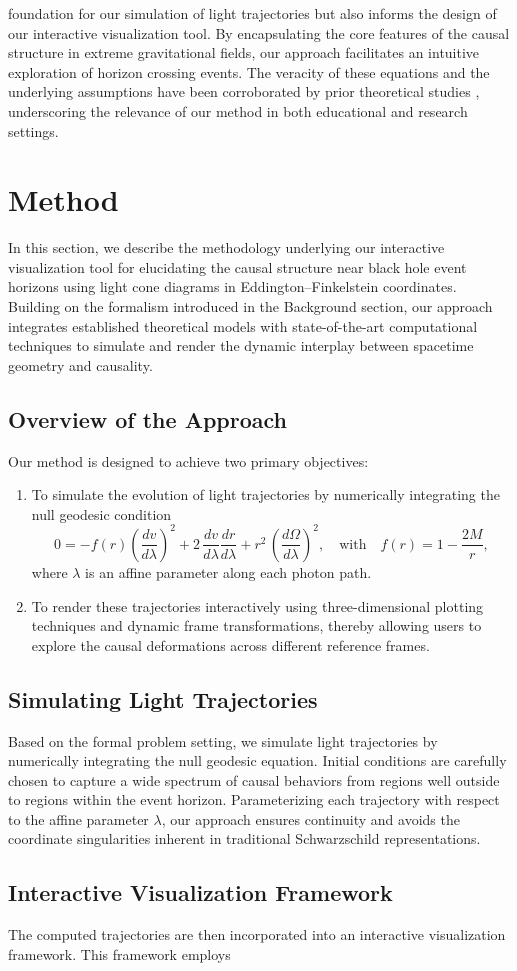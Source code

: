 \documentclass{article}
\begin{document}
foundation for our simulation of light trajectories but also informs the design of our interactive visualization tool. By encapsulating the core features of the causal structure in extreme gravitational fields, our approach facilitates an intuitive exploration of horizon crossing events. The veracity of these equations and the underlying assumptions have been corroborated by prior theoretical studies \cite{ref2}, underscoring the relevance of our method in both educational and research settings.\section{Method}
In this section, we describe the methodology underlying our interactive visualization tool for elucidating the causal structure near black hole event horizons using light cone diagrams in Eddington--Finkelstein coordinates. Building on the formalism introduced in the Background section, our approach integrates established theoretical models with state-of-the-art computational techniques to simulate and render the dynamic interplay between spacetime geometry and causality.\subsection{Overview of the Approach}Our method is designed to achieve two primary objectives:\begin{enumerate}  \item To simulate the evolution of light trajectories by numerically integrating the null geodesic condition  \begin{equation}  0 = -f(r)\left(\frac{dv}{d\lambda}\right)^2 + 2\,\frac{dv}{d\lambda}\frac{dr}{d\lambda} + r^2\,\left(\frac{d\Omega}{d\lambda}\right)^2, \quad \text{with} \quad f(r)=1-\frac{2M}{r},  \end{equation}  where $\lambda$ is an affine parameter along each photon path.  \item To render these trajectories interactively using three-dimensional plotting techniques and dynamic frame transformations, thereby allowing users to explore the causal deformations across different reference frames.\end{enumerate}\subsection{Simulating Light Trajectories}Based on the formal problem setting, we simulate light trajectories by numerically integrating the null geodesic equation. Initial conditions are carefully chosen to capture a wide spectrum of causal behaviors from regions well outside to regions within the event horizon. Parameterizing each trajectory with respect to the affine parameter $\lambda$, our approach ensures continuity and avoids the coordinate singularities inherent in traditional Schwarzschild representations.\subsection{Interactive Visualization Framework}The computed trajectories are then incorporated into an interactive visualization framework. This framework employs 
\end{document}
